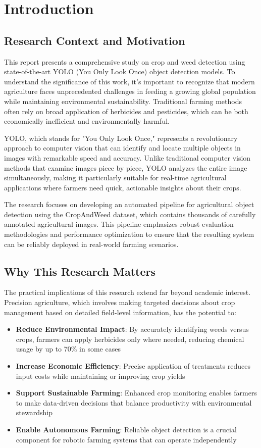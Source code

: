 \section{Introduction}
\subsection{Research Context and Motivation}

This report presents a comprehensive study on crop and weed detection using state-of-the-art YOLO (You Only Look Once) object detection models. To understand the significance of this work, it's important to recognize that modern agriculture faces unprecedented challenges in feeding a growing global population while maintaining environmental sustainability. Traditional farming methods often rely on broad application of herbicides and pesticides, which can be both economically inefficient and environmentally harmful.

YOLO, which stands for "You Only Look Once," represents a revolutionary approach to computer vision that can identify and locate multiple objects in images with remarkable speed and accuracy. Unlike traditional computer vision methods that examine images piece by piece, YOLO analyzes the entire image simultaneously, making it particularly suitable for real-time agricultural applications where farmers need quick, actionable insights about their crops.

The research focuses on developing an automated pipeline for agricultural object detection using the CropAndWeed dataset, which contains thousands of carefully annotated agricultural images. This pipeline emphasizes robust evaluation methodologies and performance optimization to ensure that the resulting system can be reliably deployed in real-world farming scenarios.

\subsection{Why This Research Matters}

The practical implications of this research extend far beyond academic interest. Precision agriculture, which involves making targeted decisions about crop management based on detailed field-level information, has the potential to:

\begin{itemize}
    \item \textbf{Reduce Environmental Impact}: By accurately identifying weeds versus crops, farmers can apply herbicides only where needed, reducing chemical usage by up to 70\% in some cases
    \item \textbf{Increase Economic Efficiency}: Precise application of treatments reduces input costs while maintaining or improving crop yields
    \item \textbf{Support Sustainable Farming}: Enhanced crop monitoring enables farmers to make data-driven decisions that balance productivity with environmental stewardship
    \item \textbf{Enable Autonomous Farming}: Reliable object detection is a crucial component for robotic farming systems that can operate independently
\end{itemize}

